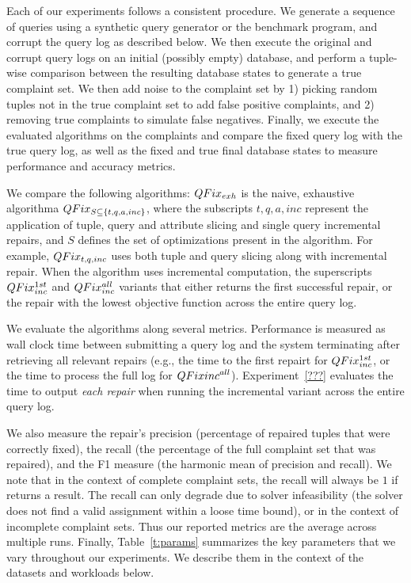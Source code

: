 Each of our experiments follows a consistent procedure. 
We generate a sequence of queries using a synthetic query generator or 
the benchmark program, and corrupt the query log as described below. 
We then execute the original and corrupt query logs on an initial (possibly empty) database,
and perform a tuple-wise comparison between the resulting database states 
to generate a true complaint set.  
We then add noise to the complaint set by 1) picking random tuples not in the true
complaint set to add false positive complaints, and 2) removing true complaints to simulate false negatives.
Finally, we execute the evaluated algorithms on the complaints and compare the fixed
query log with the true query log, as well as the fixed and true
final database states to measure performance and accuracy metrics.

We compare the following algorithms:
$QFix_{exh}$ is the naive, exhaustive algorithma 
$QFix_{S \subseteq \{t,q,a,inc\}}$, where the subscripts $t,q,a,inc$ represent the
application of tuple, query and attribute slicing and single query incremental repairs, 
and $S$ defines the set of optimizations present in the algorithm.
For example, $QFix_{t,q,inc}$ uses both tuple and query slicing along with incremental repair.
When the algorithm uses incremental computation, the superscripts $QFix_{inc}^{1st}$
and $QFix_{inc}^{all}$ variants that either returns the first successful repair,
or the repair with the lowest objective function across the entire query log.

We evaluate the algorithms along several metrics.  Performance is measured as wall clock
time between submitting a query log and the system terminating after retrieving all relevant repairs 
(e.g., the time to the first repairt for $QFix_{inc}^{1st}$, or the time to process the full log for $QFix{inc}^{all}$).  
Experiment~\ref{???} evaluates the time to output {\it each repair} when running the 
incremental variant across the entire query log.  

We also measure the repair's precision (percentage of repaired tuples that were correctly fixed), 
the recall (the percentage of the full complaint set that was repaired), 
and the F1 measure (the harmonic mean of precision and recall).
We note that in the context of complete complaint sets, the recall will always be $1$ if \sys returns a result.
The recall can only degrade due to solver infeasibility (the solver does not find a valid assignment within a loose time bound), 
or in the context of incomplete complaint sets.   Thus our reported metrics are the average across multiple runs.
Finally, Table~\ref{t:params} summarizes the key parameters that we vary throughout our experiments.  
We describe them in the context of the datasets and workloads below.



